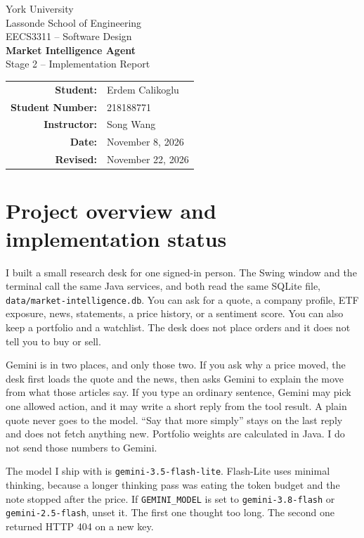 \documentclass[11pt]{article}
\begin{document}
\begin{titlepage}
\centering
\vspace*{0.75in}
{\Large York University\\[0.15em]}
{\large Lassonde School of Engineering\\[2.4em]}
{\Large EECS3311 -- Software Design\\[2.6em]}
{\Huge\bfseries Market Intelligence Agent\\[0.55em]}
{\Large Stage 2 -- Implementation Report\\[2.15in]}
\begin{tabular}{rl}
\textbf{Student:} & Erdem Calikoglu \\
\textbf{Student Number:} & 218188771 \\
\textbf{Instructor:} & Song Wang \\
\textbf{Date:} & November 8, 2026 \\
\textbf{Revised:} & November 22, 2026 \\
\end{tabular}
\vfill
\end{titlepage}

\tableofcontents
\newpage

\section{Project overview and implementation status}

I built a small research desk for one signed-in person. The Swing window and the terminal call the same Java services, and both read the same SQLite file, \texttt{data/market-intelligence.db}. You can ask for a quote, a company profile, ETF exposure, news, statements, a price history, or a sentiment score. You can also keep a portfolio and a watchlist. The desk does not place orders and it does not tell you to buy or sell.

Gemini is in two places, and only those two. If you ask why a price moved, the desk first loads the quote and the news, then asks Gemini to explain the move from what those articles say. If you type an ordinary sentence, Gemini may pick one allowed action, and it may write a short reply from the tool result. A plain quote never goes to the model. ``Say that more simply'' stays on the last reply and does not fetch anything new. Portfolio weights are calculated in Java. I do not send those numbers to Gemini.

The model I ship with is \texttt{gemini-3.5-flash-lite}. Flash-Lite uses minimal thinking, because a longer thinking pass was eating the token budget and the note stopped after the price. If \texttt{GEMINI\_MODEL} is set to \texttt{gemini-3.8-flash} or \texttt{gemini-2.5-flash}, unset it. The first one thought too long. The second one returned HTTP 404 on a new key.
\end{document}
